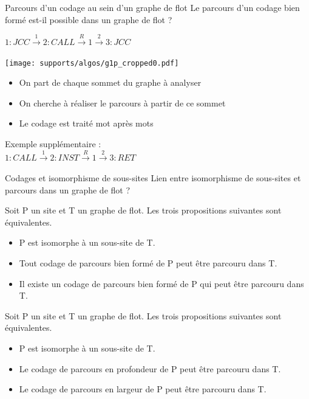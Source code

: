 \documentclass{beamer}
\begin{document}
\begin{frame}{Parcours d'un codage au sein d'un graphe de flot}
Le parcours d'un codage bien formé est-il possible dans un graphe de flot ?

\begin{minipage}{0.5\textwidth}
$1: JCC\xrightarrow{1} 2: CALL\xrightarrow{R} 1\xrightarrow{2} 3: JCC$%
\end{minipage}
\begin{minipage}{0.4\textwidth}
\begin{center}
\texttt{[image: supports/algos/g1p\_cropped0.pdf]}
\end{center}
\end{minipage}

\pause
\begin{itemize}
\item On part de chaque sommet du graphe à analyser
\item On cherche à réaliser le parcours à partir de ce sommet
\item Le codage est traité mot après mots
\end{itemize}

\pause
Exemple supplémentaire :\\
$1: CALL\xrightarrow{1} 2: INST\xrightarrow{R} 1\xrightarrow{2} 3: RET$
\end{frame}

\begin{frame}{Codages et isomorphisme de sous-sites}
Lien entre isomorphisme de sous-sites et parcours dans un graphe de flot ?

\pause
\begin{theo}
 Soit P un site et T un graphe de flot. Les trois propositions suivantes sont équivalentes.
 \begin{itemize}
  \item P est isomorphe à un sous-site de T.
  \item Tout codage de parcours bien formé de P peut être parcouru dans T.
  \item Il existe un codage de parcours bien formé de P qui peut être parcouru dans T.
 \end{itemize}
\end{theo}

\pause
\begin{cor}
 Soit P un site et T un graphe de flot. Les trois propositions suivantes sont équivalentes.
 \begin{itemize}
  \item P est isomorphe à un sous-site de T.
  \item Le codage de parcours en profondeur de P peut être parcouru dans T.
  \item Le codage de parcours en largeur de P peut être parcouru dans T.
 \end{itemize}
\label{cor:gf}
\end{cor}
\end{frame}
\end{document}
